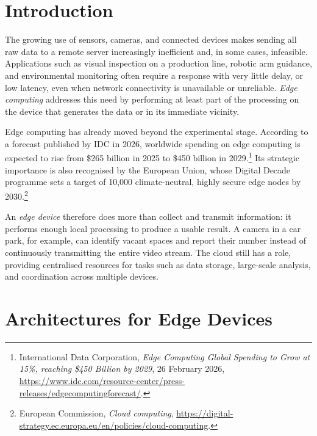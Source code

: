 
\section{Introduction}

The growing use of sensors, cameras, and connected devices makes sending all raw data to a remote server increasingly inefficient and, in some cases, infeasible. Applications such as visual inspection on a production line, robotic arm guidance, and environmental monitoring often require a response with very little delay, or low latency, even when network connectivity is unavailable or unreliable. \emph{Edge computing} addresses this need by performing at least part of the processing on the device that generates the data or in its immediate vicinity.

Edge computing has already moved beyond the experimental stage. According to a forecast published by IDC in 2026, worldwide spending on edge computing is expected to rise from \$265 billion in 2025 to \$450 billion in 2029.\footnote{International Data Corporation, \emph{Edge Computing Global Spending to Grow at 15\%, reaching \$450 Billion by 2029}, 26 February 2026, \url{https://www.idc.com/resource-center/press-releases/edgecomputingforecast/}.} Its strategic importance is also recognised by the European Union, whose Digital Decade programme sets a target of 10,000 climate-neutral, highly secure edge nodes by 2030.\footnote{European Commission, \emph{Cloud computing}, \url{https://digital-strategy.ec.europa.eu/en/policies/cloud-computing}.}

An \emph{edge device} therefore does more than collect and transmit information: it performs enough local processing to produce a usable result. A camera in a car park, for example, can identify vacant spaces and report their number instead of continuously transmitting the entire video stream. The cloud still has a role, providing centralised resources for tasks such as data storage, large-scale analysis, and coordination across multiple devices.

\section{Architectures for Edge Devices}

